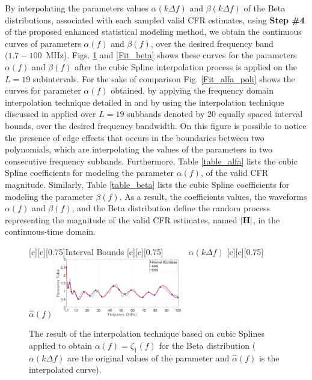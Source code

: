 \documentclass[journal]{IEEEtran}
\begin{document}
By interpolating the parameters values $\alpha(k\Delta f)$ and $\beta(k\Delta f)$ of the Beta distributions, associated with each sampled valid \ac{CFR} estimates, using \textbf{Step \#4} of the proposed enhanced statistical modeling method, we obtain the continuous curves of parameters $\alpha(f)$ and $\beta(f)$, over the desired frequency band $(1.7-100$~MHz). Figs. \ref{Fit_alfa} and \ref{Fit_beta} shows these curves for the parameters $\alpha(f)$ and $\beta(f)$ after the cubic Spline interpolation process is applied on the $L=19$ subintervals. For the sake of comparison Fig. \ref{Fit_alfa_poli} shows the curves for parameter $\alpha(f)$ obtained, by applying the frequency domain interpolation technique detailed in \cite{mitra} and by using the interpolation technique discussed in \cite{Luis:AI} applied over $L=19$ subbands denoted by $20$ equally spaced interval bounds, over the desired frequency bandwidth. On this figure is possible to notice the presence of edge effects that occurs in the boundaries between two polynomials, which are interpolating the values of the parameters in two consecutive frequency subbands. Furthermore, Table \ref{table_alfa} lists the cubic Spline coefficients for modeling the parameter $\alpha(f)$, of the valid \ac{CFR} magnitude. Similarly, Table \ref{table_beta} lists the cubic Spline coefficients for modeling the parameter $\beta(f)$. As a result, the coefficients values, the waveforms  $\alpha(f)$ and $\beta(f)$, and the Beta distribution define the random process representing the magnitude of the valid \ac{CFR} estimates, named $|{\bf H}|$, in the continuous-time domain.

\begin{figure}[h]
	\centering
	[c][0.75]{Interval Bounds}
	[c][0.75]{~~~~~~$\alpha(k \Delta f)$}
	[c][0.75]{~~$\hat{\alpha}(f)$}
	\includegraphics[width=0.49\textwidth]{images/Alfa_fit_1.7.eps}
	\caption{The result of the interpolation technique based on cubic Splines applied to obtain $\alpha(f) = \zeta_1(f)$ for the Beta distribution ($\alpha(k \Delta f)$ are the original values of the parameter and $\hat{\alpha}(f)$ is the interpolated curve).}
	\label{Fit_alfa}
\end{figure}
\end{document}
